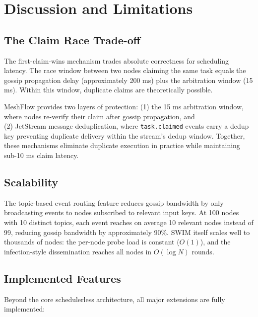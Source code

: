 \documentclass[sigconf]{acmart}
\begin{document}
\section{Discussion and Limitations}

\subsection{The Claim Race Trade-off}

The first-claim-wins mechanism trades absolute correctness for scheduling latency. The race window between two nodes claiming the same task equals the gossip propagation delay (approximately 200 ms) plus the arbitration window (15 ms). Within this window, duplicate claims are theoretically possible.

MeshFlow provides two layers of protection: (1) the 15 ms arbitration window, where nodes re-verify their claim after gossip propagation, and \\ (2) JetStream message deduplication, where \texttt{task.claimed} events carry a dedup key preventing duplicate delivery within the stream's dedup window. Together, these mechanisms eliminate duplicate execution in practice while maintaining sub-10 ms claim latency.

\subsection{Scalability}

The topic-based event routing feature reduces gossip bandwidth by only broadcasting events to nodes subscribed to relevant input keys. At 100 nodes with 10 distinct topics, each event reaches on average 10 relevant nodes instead of 99, reducing gossip bandwidth by approximately 90\%. SWIM itself scales well to thousands of nodes: the per-node probe load is constant ($O(1)$), and the infection-style dissemination reaches all nodes in $O(\log N)$ rounds.

\subsection{Implemented Features}

Beyond the core schedulerless architecture, all major extensions are fully implemented:
\end{document}
